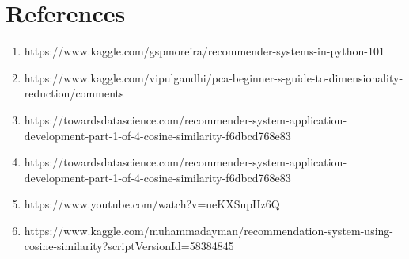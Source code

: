 \documentclass[10pt,conference]{IEEEtran}
\begin{document}
\section{References}\label{sec:6. References}
\begin{enumerate}
  \item https://www.kaggle.com/gspmoreira/recommender-systems-in-python-101
  \item https://www.kaggle.com/vipulgandhi/pca-beginner-s-guide-to-dimensionality-reduction/comments
  \item https://towardsdatascience.com/recommender-system-application-development-part-1-of-4-cosine-similarity-f6dbcd768e83
  \item https://towardsdatascience.com/recommender-system-application-development-part-1-of-4-cosine-similarity-f6dbcd768e83
  \item https://www.youtube.com/watch?v=ueKXSupHz6Q
  \item https://www.kaggle.com/muhammadayman/recommendation-system-using-cosine-similarity?scriptVersionId=58384845
\end{enumerate}

\end{document}
